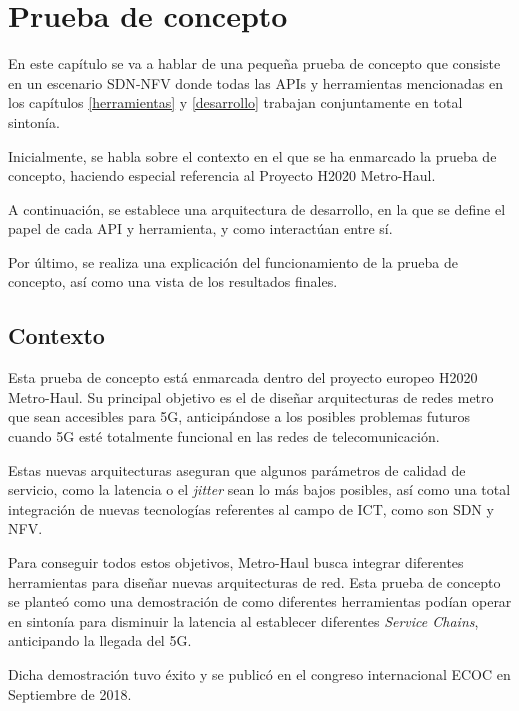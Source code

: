 \chapter{Prueba de concepto}
\label{pruebaconcepto}

En este capítulo se va a hablar de una pequeña prueba de concepto que consiste en un escenario \ac{SDN}-\ac{NFV} donde todas las \acp{API} y herramientas mencionadas en los capítulos \ref{herramientas} y \ref{desarrollo} trabajan conjuntamente en total sintonía.

Inicialmente, se habla sobre el contexto en el que se ha enmarcado la prueba de concepto, haciendo especial referencia al Proyecto H2020 Metro-Haul\cite{metrohaulbib}.

A continuación, se establece una arquitectura de desarrollo, en la que se define el papel de cada \ac{API} y herramienta, y como interactúan entre sí.

Por último, se realiza una explicación del funcionamiento de la prueba de concepto, así como una vista de los resultados finales.

\section{Contexto}
\label{sec:contexto}

Esta prueba de concepto está enmarcada dentro del proyecto europeo H2020 Metro-Haul\cite{metrohaulbib}. Su principal objetivo es el de diseñar arquitecturas de redes metro que sean accesibles para 5G, anticipándose a los posibles problemas futuros cuando 5G esté totalmente funcional en las redes de telecomunicación.

Estas nuevas arquitecturas aseguran que algunos parámetros de calidad de servicio, como la latencia o el \textit{jitter} sean lo más bajos posibles, así como una total integración de nuevas tecnologías referentes al campo de \ac{ICT}, como son \ac{SDN} y \ac{NFV}.

Para conseguir todos estos objetivos, Metro-Haul busca integrar diferentes herramientas para diseñar nuevas arquitecturas de red. Esta prueba de concepto se planteó como una demostración de como diferentes herramientas podían operar en sintonía para disminuir la latencia al establecer diferentes \textit{Service Chains}, anticipando la llegada del 5G.\cite{demoecocbib}

Dicha demostración tuvo éxito y se publicó en el congreso internacional \ac{ECOC}\cite{ecocbib} en Septiembre de 2018.

